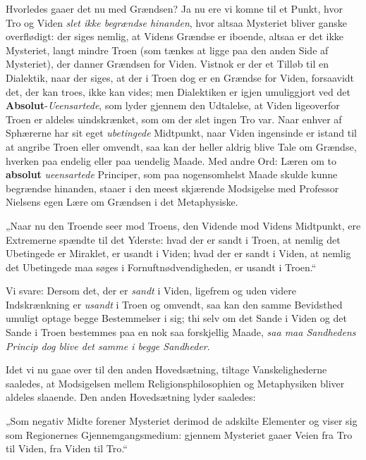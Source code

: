 \documentclass[12pt,a4paper]{book}
\newcommand{\opage}[1]{\marginnote{\footnotesize\textit{[#1]}}}
\begin{document}
Hvorledes gaaer det nu med Grændsen? Ja
nu ere vi komne til et Punkt, hvor Tro og Viden
\emph{slet ikke begrændse hinanden}, hvor altsaa
Mysteriet bliver ganske overflødigt: der siges nemlig,
at Videns Grændse er iboende, altsaa er det
ikke Mysteriet, langt mindre Troen (som tænkes at ligge
paa den anden Side af Mysteriet), der danner Grændsen
for Viden. Vistnok er der et Tilløb til en Dialektik,
naar der siges, at der i Troen dog er en Grændse for
Viden, forsaavidt det, der kan troes, ikke kan vides; men
Dialektiken er igjen umuliggjort ved det \textbf{Absolut}-\emph{Ueensartede},
som lyder gjennem den Udtalelse, at Viden ligeoverfor
Troen er aldeles uindskrænket, som om der slet
ingen Tro var. Naar enhver af Sphærerne har sit
eget \emph{ubetingede} Midtpunkt, naar Viden ingensinde er
istand til at angribe Troen eller omvendt, saa kan der
heller aldrig blive Tale om Grændse, hverken paa endelig
eller paa uendelig Maade. Med andre Ord: Læren
om to \textbf{absolut} \emph{ueensartede} Principer, som paa
nogensomhelst Maade skulde kunne begrændse hinanden,
staaer i den meest skjærende Modsigelse med Professor
Nielsens egen Lære om Grændsen i det Metaphysiske.

„Naar nu den Troende seer mod Troens, den Vidende
mod Videns Midtpunkt, ere Extremerne spændte
til det Yderste: hvad der er sandt i Troen, at nemlig
det Ubetingede er Miraklet, er usandt i Viden; hvad der
er sandt i Viden, at nemlig det Ubetingede maa søges i
Fornuftnødvendigheden, er usandt i Troen.“

\opage{18}\setcounter{footnote}{0}%
Vi svare: Dersom det, der er \emph{sandt} i Viden,
ligefrem og uden videre Indskrænkning er \emph{usandt} i
Troen og omvendt, saa kan den samme Bevidsthed umuligt
optage begge Bestemmelser i sig; thi selv om det
Sande i Viden og det Sande i Troen bestemmes paa
en nok saa forskjellig Maade, \emph{saa maa Sandhedens
Princip dog blive det samme i begge Sandheder}.

Idet vi nu gaae over til den anden Hovedsætning,
tiltage Vanskelighederne saaledes, at Modsigelsen mellem
Religionsphilosophien og Metaphysiken bliver aldeles slaaende.
Den anden Hovedsætning lyder saaledes:

„Som negativ Midte forener Mysteriet derimod de
adskilte Elementer og viser sig som Regionernes Gjennemgangsmedium:
gjennem Mysteriet gaaer Veien fra
Tro til Viden, fra Viden til Tro.“
\end{document}
